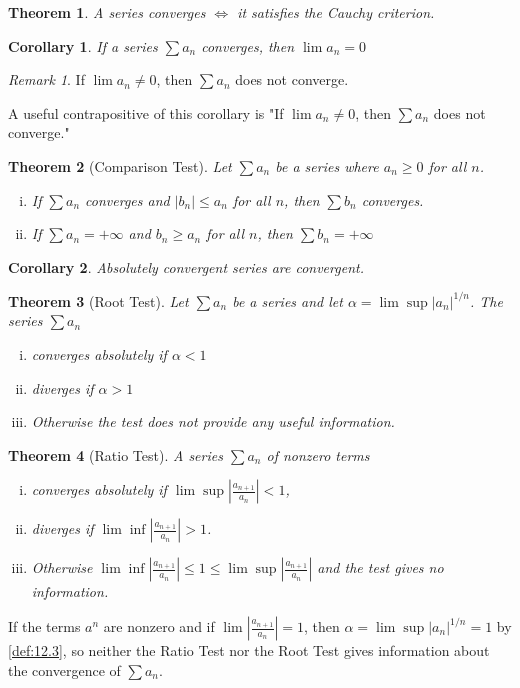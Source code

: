 \documentclass[12pt, lettersize]{book}
\theoremstyle{plain}
\newtheorem{thm}{Theorem}[section]
\newtheorem{cor}{Corollary}[thm]
\theoremstyle{definition}
\theoremstyle{remark}
\newtheorem*{rem}{Remark}
\begin{document}
	\begin{thm}
		A series converges $\iff$ it satisfies the Cauchy criterion. 
	\end{thm}
	\begin{cor}\label{def:If a_n converges then lim(a_n)=0}
		If a series $\sum a_n$ converges, then $\lim a_n=0$
	\end{cor}
	\begin{rem}
		If $\lim a_n\neq0$, then $\sum a_n$ does not converge.
	\end{rem}
	A useful contrapositive of this corollary is "If $\lim a_n\neq0$, then $\sum a_n$ does not converge."
	
	\setcounter{equation}{0}
	\begin{thm}[Comparison Test]\label{def:Comparison Test}
		Let $\sum a_n$ be a series where $a_n\geq0$ for all $n$.
		\begin{enumerate}[(i)]
			\item If $\sum a_n$ converges and $|b_n|\leq a_n$ for all $n$, then $\sum b_n$ converges.
			\item If $\sum a_n=+\infty$ and $b_n\geq a_n$ for all $n$, then $\sum b_n=+\infty$
		\end{enumerate}
	\end{thm}

	\begin{cor}
		Absolutely convergent series are convergent.
	\end{cor}
	
	\begin{thm}[Root Test]\label{def:Root Test}
		Let	$\sum a_n$ be a series and let $\alpha=\lim\sup|a_n|^{1/n}$. The series $\sum a_n$
		\begin{enumerate}[(i)]
			\item converges absolutely if $\alpha<1$
			\item diverges if $\alpha>1$
			\item Otherwise the test does not provide any useful information.
		\end{enumerate}
	\end{thm}
	
	\begin{thm}[Ratio Test]\label{def:Ratio Test}
		A series $\sum a_n$ of nonzero terms
		\begin{enumerate}[(i)]
			\item converges absolutely if $\lim\sup\left|\frac{a_{n+1}}{a_n}\right|<1$,
			\item diverges if $\lim\inf\left|\frac{a_{n+1}}{a_n}\right|>1$.
			\item Otherwise $\lim\inf\left|\frac{a_{n+1}}{a_n}\right|\leq1\leq\lim\sup\left|\frac{a_{n+1}}{a_n}\right|$ and
			the test gives no information.
		\end{enumerate}
	\end{thm}
	If the terms $a^n$ are nonzero and if $\lim\left|\frac{a_{n+1}}{a_n}\right|=1$, then $\alpha=\lim\sup|a_n|^{1/n}=1$
	by \ref{def:12.3}, so neither the Ratio Test nor the Root Test gives information about the convergence of $\sum a_n$.
	\newpage
	
\end{document}

